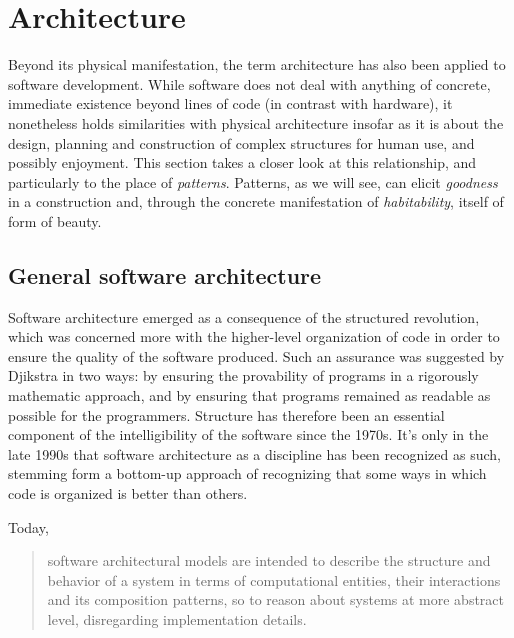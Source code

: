 \documentclass{article}
\begin{document}
\section{Architecture}

Beyond its physical manifestation, the term architecture has also been applied to software development. While software does not deal with anything of concrete, immediate existence beyond lines of code (in contrast with hardware), it nonetheless holds similarities with physical architecture insofar as it is about the design, planning and construction of complex structures for human use, and possibly enjoyment. This section takes a closer look at this relationship, and particularly to the place of \emph{patterns}. Patterns, as we will see, can elicit \emph{goodness} in a construction and, through the concrete manifestation of \emph{habitability}, itself of form of beauty.

\subsection{General software architecture}

Software architecture emerged as a consequence of the structured revolution\cite{dijkstra_chapter_1972}, which was concerned more with the higher-level organization of code in order to ensure the quality of the software produced. Such an assurance was suggested by Djikstra in two ways: by ensuring the provability of programs in a rigorously mathematic approach, and by ensuring that programs remained as readable as possible for the programmers. Structure has therefore been an essential component of the intelligibility of the software since the 1970s. It's only in the late 1990s that software architecture as a discipline has been recognized as such, stemming form a bottom-up approach of recognizing that some ways in which code is organized is better than others.

Today, 
\begin{quote}
  software architectural models are intended to describe the structure and behavior of a system in terms of computational entities, their interactions and its composition patterns, so to reason about systems at more abstract  level, disregarding implementation details.\cite{garland_software_2000}
\end{quote}
\end{document}
